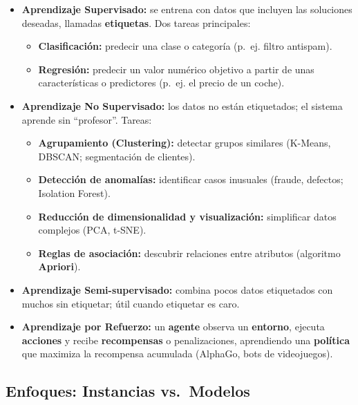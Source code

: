 \documentclass[12pt]{book} %
\providecommand{\tightlist}{%
  \setlength{\itemsep}{0pt}\setlength{\parskip}{0pt}}
\begin{document}
\begin{itemize}
\tightlist
\item
  \textbf{Aprendizaje Supervisado:} se entrena con datos que incluyen
  las soluciones deseadas, llamadas \textbf{etiquetas}. Dos tareas
  principales:

  \begin{itemize}
  \tightlist
  \item
    \textbf{Clasificación:} predecir una clase o categoría (p.~ej.
    filtro antispam).
  \item
    \textbf{Regresión:} predecir un valor numérico objetivo a partir de
    unas características o predictores (p.~ej. el precio de un coche).
  \end{itemize}
\item
  \textbf{Aprendizaje No Supervisado:} los datos no están etiquetados;
  el sistema aprende sin ``profesor''. Tareas:

  \begin{itemize}
  \tightlist
  \item
    \textbf{Agrupamiento (Clustering):} detectar grupos similares
    (K-Means, DBSCAN; segmentación de clientes).
  \item
    \textbf{Detección de anomalías:} identificar casos inusuales
    (fraude, defectos; Isolation Forest).
  \item
    \textbf{Reducción de dimensionalidad y visualización:} simplificar
    datos complejos (PCA, t-SNE).
  \item
    \textbf{Reglas de asociación:} descubrir relaciones entre atributos
    (algoritmo \textbf{Apriori}).
  \end{itemize}
\item
  \textbf{Aprendizaje Semi-supervisado:} combina pocos datos etiquetados
  con muchos sin etiquetar; útil cuando etiquetar es caro.
\item
  \textbf{Aprendizaje por Refuerzo:} un \textbf{agente} observa un
  \textbf{entorno}, ejecuta \textbf{acciones} y recibe
  \textbf{recompensas} o penalizaciones, aprendiendo una
  \textbf{política} que maximiza la recompensa acumulada (AlphaGo, bots
  de videojuegos).
\end{itemize}

\hypertarget{enfoques-instancias-vs.-modelos}{%
\subsection{Enfoques: Instancias
vs.~Modelos}\label{enfoques-instancias-vs.-modelos}}
\end{document}
